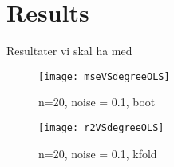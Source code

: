\section{Results}
\label{sec:results}
Resultater vi skal ha med
\begin{itemize}

\end{itemize}

\begin{figure}[htbp]
	\centering
	\texttt{[image: mseVSdegreeOLS]}
	\caption{n=20, noise = 0.1, boot}
	\label{fig:mseVSdegreeOLS}
\end{figure}

\begin{figure}[htbp]
	\centering
	\texttt{[image: r2VSdegreeOLS]}
	\caption{n=20, noise = 0.1, kfold}
	\label{fig:r2VSdegreeOLS}
\end{figure}
